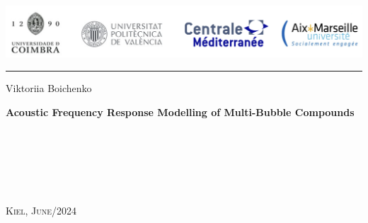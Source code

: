 \documentclass[a4paper,11pt]{article}
\begin{document}

\begin{titlepage}

\begin{minipage}{0.96\linewidth}
\centering
\includegraphics[width=\linewidth]{figures/universities.png}
\end{minipage}
\vspace{20pt}
\hrule
\vspace{5pt}

\begin{center}
    \vfill
    {
        \LARGE{}
        \vspace{0.5cm}
        \Large
    }   


    \vfill
    
    \Large{Viktoriia Boichenko}
    
    \vfill

    \LARGE\textbf{Acoustic Frequency Response Modelling of Multi-Bubble Compounds}
     \Large {}
\end{center}

\vfill

\begin{minipage}[t]{0.5\linewidth}
     \medskip\\
     \medskip\\
     \medskip\\
\end{minipage}
\begin{minipage}[t]{0.5\linewidth}
\end{minipage}

\vfill

\begin{minipage}[t]{0.5\linewidth}
    \textsc{} \medskip\\
\end{minipage}
\begin{minipage}[t]{0.5\linewidth}
    \large\textsc{Kiel, June/2024}\medskip\\
\end{minipage}

\end{titlepage}
%     
\end{document}
